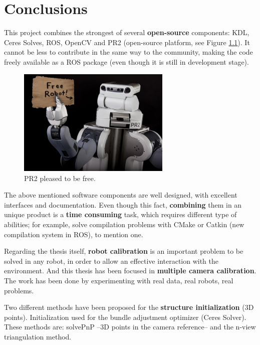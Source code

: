 \chapter{Conclusions}
\label{cha:conclusions}

This project combines the strongest of several \textbf{open-source} components: KDL, Ceres Solves, ROS, OpenCV and PR2 (open-source platform, see Figure \ref{fig:PR2_free_robot}). It cannot be less to contribute in the same way to the community, making the code freely available as a ROS package (even though it is still in development stage).

\begin{figure}[!htbp]
 \centering
 \includegraphics[width=0.65\textwidth]{images/PR2_free_robot.jpg}
 \caption{PR2 pleased to be free.}
 \label{fig:PR2_free_robot}
\end{figure}

The above mentioned software components are well designed, with excellent interfaces and documentation. Even though this fact, \textbf{combining} them in an unique product is a \textbf{time consuming} task, which requires different type of abilities; for example, solve compilation problems with CMake or Catkin (new compilation system in ROS), to mention one.

Regarding the thesis itself, \textbf{robot calibration} is an important problem to be solved in any robot, in order to allow an effective interaction with the environment. And this thesis has been focused in \textbf{multiple camera calibration}. The work has been done by experimenting with real data, real robots, real problems.

Two different methods have been proposed for the \textbf{structure initialization} (3D points). Initialization used for the bundle adjustment optimizer (Ceres Solver). These methods are: solvePnP --3D points in the camera reference-- and the n-view triangulation method.


